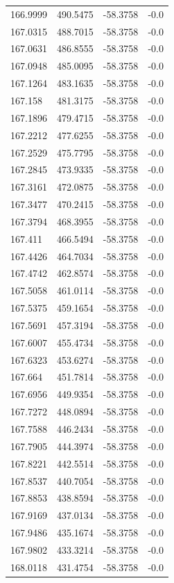 \begin{table}[H]
\begin{tabular}{llll}
166.9999 & 490.5475 & -58.3758 & -0.0 \\
167.0315 & 488.7015 & -58.3758 & -0.0 \\
167.0631 & 486.8555 & -58.3758 & -0.0 \\
167.0948 & 485.0095 & -58.3758 & -0.0 \\
167.1264 & 483.1635 & -58.3758 & -0.0 \\
167.158 & 481.3175 & -58.3758 & -0.0 \\
167.1896 & 479.4715 & -58.3758 & -0.0 \\
167.2212 & 477.6255 & -58.3758 & -0.0 \\
167.2529 & 475.7795 & -58.3758 & -0.0 \\
167.2845 & 473.9335 & -58.3758 & -0.0 \\
167.3161 & 472.0875 & -58.3758 & -0.0 \\
167.3477 & 470.2415 & -58.3758 & -0.0 \\
167.3794 & 468.3955 & -58.3758 & -0.0 \\
167.411 & 466.5494 & -58.3758 & -0.0 \\
167.4426 & 464.7034 & -58.3758 & -0.0 \\
167.4742 & 462.8574 & -58.3758 & -0.0 \\
167.5058 & 461.0114 & -58.3758 & -0.0 \\
167.5375 & 459.1654 & -58.3758 & -0.0 \\
167.5691 & 457.3194 & -58.3758 & -0.0 \\
167.6007 & 455.4734 & -58.3758 & -0.0 \\
167.6323 & 453.6274 & -58.3758 & -0.0 \\
167.664 & 451.7814 & -58.3758 & -0.0 \\
167.6956 & 449.9354 & -58.3758 & -0.0 \\
167.7272 & 448.0894 & -58.3758 & -0.0 \\
167.7588 & 446.2434 & -58.3758 & -0.0 \\
167.7905 & 444.3974 & -58.3758 & -0.0 \\
167.8221 & 442.5514 & -58.3758 & -0.0 \\
167.8537 & 440.7054 & -58.3758 & -0.0 \\
167.8853 & 438.8594 & -58.3758 & -0.0 \\
167.9169 & 437.0134 & -58.3758 & -0.0 \\
167.9486 & 435.1674 & -58.3758 & -0.0 \\
167.9802 & 433.3214 & -58.3758 & -0.0 \\
168.0118 & 431.4754 & -58.3758 & -0.0 \\

\end{tabular}
\end{table}
